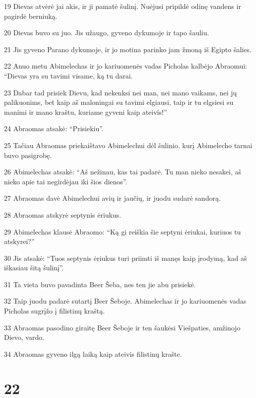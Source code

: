\par 19 Dievas atvėrė jai akis, ir ji pamatė šulinį. Nuėjusi pripildė odinę vandens ir pagirdė berniuką. 
\par 20 Dievas buvo su juo. Jis užaugo, gyveno dykumoje ir tapo šauliu. 
\par 21 Jis gyveno Parano dykumoje, ir jo motina parinko jam žmoną iš Egipto šalies. 
\par 22 Anuo metu Abimelechas ir jo kariuomenės vadas Picholas kalbėjo Abraomui: “Dievas yra su tavimi visame, ką tu darai. 
\par 23 Dabar tad prisiek Dievu, kad nekenksi nei man, nei mano vaikams, nei jų palikuonims, bet kaip aš maloningai su tavimi elgiausi, taip ir tu elgsiesi su manimi ir mano kraštu, kuriame gyveni kaip ateivis!” 
\par 24 Abraomas atsakė: “Prisiekiu”. 
\par 25 Tačiau Abraomas priekaištavo Abimelechui dėl šulinio, kurį Abimelecho tarnai buvo pasigrobę. 
\par 26 Abimelechas atsakė: “Aš nežinau, kas tai padarė. Tu man nieko nesakei, aš nieko apie tai negirdėjau iki šios dienos”. 
\par 27 Abraomas davė Abimelechui avių ir jaučių, ir juodu sudarė sandorą. 
\par 28 Abraomas atskyrė septynis ėriukus. 
\par 29 Abimelechas klausė Abraomo: “Ką gi reiškia šie septyni ėriukai, kuriuos tu atskyrei?” 
\par 30 Jis atsakė: “Tuos septynis ėriukus turi priimti iš manęs kaip įrodymą, kad aš iškasiau šitą šulinį”. 
\par 31 Ta vieta buvo pavadinta Beer Šeba, nes ten jie abu prisiekė. 
\par 32 Taip juodu padarė sutartį Beer Šeboje. Abimelechas ir jo kariuomenės vadas Picholas sugrįžo į filistinų kraštą. 
\par 33 Abraomas pasodino giraitę Beer Šeboje ir ten šaukėsi Viešpaties, amžinojo Dievo, vardo. 
\par 34 Abraomas gyveno ilgą laiką kaip ateivis filistinų krašte.



\chapter{22}

